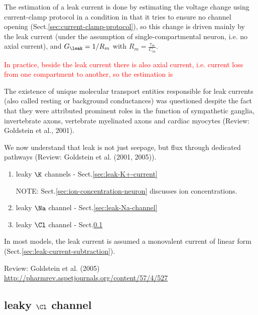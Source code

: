 The estimation of a leak current is done by estimating the voltage change using
current-clamp protocol in a condition in that it tries to ensure no channel
opening (Sect.\ref{sec:current-clamp-protocol}), so this change is driven
mainly by the leak current (under the assumption of single-compartmental
neuron, i.e. no axial current), and $G_\leak = 1/R_m$ with
$R_m=\frac{\tau_m}{C_m}$.

\textcolor{red}{In practice, beside the leak current there is also axial
current, i.e. current loss from one compartment to another, so the estimation
is}


The existence of unique molecular transport entities responsible for leak
currents (also called resting or background conductances) was questioned despite
the fact that they were attributed prominent roles in the function of
sympathetic ganglia, invertebrate axons, vertebrate myelinated axons and
cardiac myocytes (Review: Goldstein et al., 2001).

We now understand that leak is not just seepage, but flux through dedicated
pathways (Review: Goldstein et al. (2001, 2005)).

\begin{enumerate}
  \item leaky $\K$ channels - Sect.\ref{sec:leak-K+-current}

NOTE: Sect.\ref{sec:ion-concentration-neuron} discusses ion concentrations.

  \item leaky $\Na$ channel - Sect.\ref{sec:leak-Na-channel}

  \item leaky $\Cl$ channel - Sect.\ref{sec:leak-Cl-channel}
\end{enumerate}
In most models, the leak current is assumed a monovalent current of linear form
(Sect.\ref{sec:leak-current-subtraction}).


Review: Goldstein et al. (2005)
\url{http://pharmrev.aspetjournals.org/content/57/4/527}

\subsection{leaky $\Cl$ channel}
\label{sec:leak-Cl-channel}

